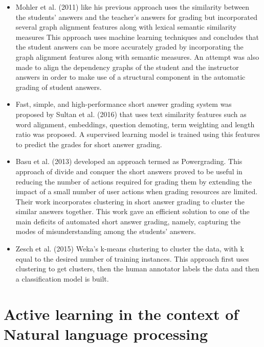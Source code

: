 \documentclass[rnd]{mas_proposal}
\begin{document}
\begin{itemize}
	\item Mohler et al. (2011) \cite{Mohler2011} like his previous approach uses the similarity between the students’ answers and the teacher’s answers for grading but incorporated several graph alignment features along with lexical semantic similarity measures This approach uses machine learning techniques and concludes that the student answers can be more accurately graded by incorporating the graph alignment features along with semantic measures. An attempt was also made to align the dependency graphs of the student and the instructor answers in order to make use of a structural component in the automatic grading of student answers.
	\item Fast, simple, and high-performance short answer grading system was proposed by Sultan et al. (2016) \cite{Sultan2016} that uses text similarity features such as word alignment, embeddings, question demoting, term weighting and length ratio was proposed. A supervised learning model is trained using this features to predict the grades for short answer grading.     
     
    \item Basu et al. (2013) \cite{Basu2013} developed an approach termed as Powergrading. This approach of divide and conquer the short answers proved to be useful in reducing the number of actions required for grading them by extending the impact of a small number of user actions when grading resources are limited. Their work incorporates clustering in short answer grading to cluster the similar answers together. This work gave an efficient solution to one of the main deficits of automated short answer grading, namely, capturing the modes of misunderstanding among the students’ answers.
    
    \item Zesch et al. (2015) \cite{zesch2015}  Weka’s k-means clustering to cluster the data, with k equal to the desired number of training instances. This approach first uses clustering to get clusters, then the human annotator labels the data and then a classification model is built.
    
\end{itemize}
\newpage
\section{Active learning in the context of  Natural language processing}
\end{document}
